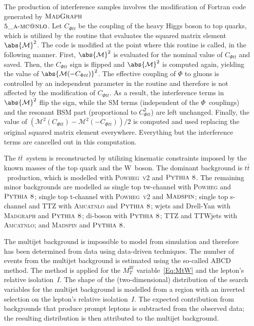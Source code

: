 The production of interference samples involves the modification of Fortran code generated by $\textsc{MadGraph}$\\
$\textsc{5\_a-mc@nlo}$.
Let $C_{\Phi tt}$ be the coupling of the heavy Higgs boson to top quarks, which is utilized by the routine that evaluates the squared matrix element $\abs{\mathcal{M}}^2$.
The code is modified at the point where this routine is called, in the following manner.
First, $\abs{\mathcal{M}}^2$ is evaluated for the nominal value of $C_{\Phi tt}$ and saved.
Then, the $C_{\Phi tt}$ sign is flipped and $\abs{\mathcal{M}}^2$ is computed again, yielding the value of $\abs{\mathcal{M}(-C_{\Phi tt})}^2$.
The effective coupling of $\Phi$ to gluons is controlled by an independent parameter in the routine and therefore is not affected by the modification of $C_{\Phi tt}$.
As a result, the interference terms in $\abs{\mathcal{M}}^2$ flip the sign, while the SM terms (independent of the $\Phi$~couplings) and the resonant BSM part (proportional to $C_{\Phi tt}^2$) are left unchanged.
Finally, the value of $(\mathcal{M}^{2}(C_{\Phi tt}) - \mathcal{M}^{2}(-C_{\Phi tt})) / 2$ is computed and used replacing the original squared matrix element everywhere.
Everything but the interference terms are cancelled out in this computation.

The $t\bar t$~system is reconstructed by utilizing kinematic constraints imposed by the known masses of the top quark and the W~boson. The dominant background is $t\bar t$~production, which is modelled with \textsc{Powheg~v2} and $\textsc{Pythia~8}$. The remaining minor backgrounds are modelled as single top tw-channel with \textsc{Powheg} and $\textsc{Pythia~8}$; single top t-channel with \textsc{Powheg~v2} and $\textsc{Madspin}$; single top s-channel and TTZ with \textsc{Amcatnlo} and $\textsc{Pythia~8}$; wjets and Drell-Yan with \textsc{Madgraph} and $\textsc{Pythia~8}$; di-boson with $\textsc{Pythia~8}$; TTZ and TTWjets with \textsc{Amcatnlo}; and \textsc{Madspin} and $\textsc{Pythia~8}$. 

The multijet background is impossible to model from simulation and therefore has been determined from data using data-driven techniques. The number of events from the multijet background is estimated using the so-called ABCD method. The method is applied for the $M_{T}^W$ variable~\ref{Eq:MtW} and the lepton's relative isolation~$I$. The shape of the (two-dimensional) distribution of the search variables for the multijet background is modelled from a region with an inverted selection on the lepton's relative isolation~$I$. The expected contribution from backgrounds that produce prompt leptons is subtracted from the observed data; the resulting distribution is then attributed to the multijet background.

